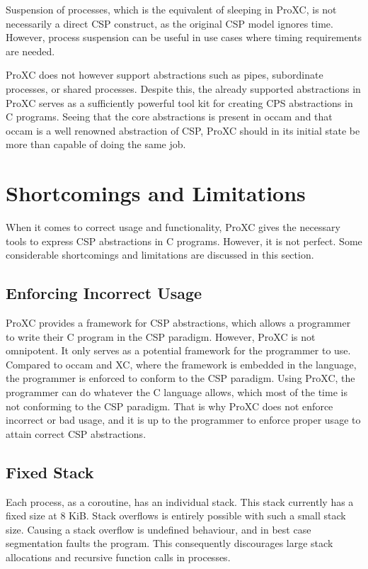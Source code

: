 Suspension of processes, which is the equivalent of sleeping in ProXC, is not necessarily a direct CSP construct, as the original CSP model ignores time. However, process suspension can be useful in use cases where timing requirements are needed.

ProXC does not however support abstractions such as pipes, subordinate processes, or sha\-red processes. Despite this, the already supported abstractions in ProXC serves as a sufficiently powerful tool kit for creating CPS abstractions in C programs. Seeing that the core abstractions is present in occam and that occam is a well renowned abstraction of CSP, ProXC should in its initial state be more than capable of doing the same job. 

\section{Shortcomings and Limitations}

When it comes to correct usage and functionality, ProXC gives the necessary tools to express CSP abstractions in C programs. However, it is not perfect. Some considerable shortcomings and limitations are discussed in this section.

\subsection{Enforcing Incorrect Usage}

ProXC provides a framework for CSP abstractions, which allows a programmer to write their C program in the CSP paradigm. However, ProXC is not omnipotent. It only serves as a potential framework for the programmer to use. Compared to occam and XC, where the framework is embedded in the language, the programmer is enforced to conform to the CSP paradigm. Using ProXC, the programmer can do whatever the C language allows, which most of the time is not conforming to the CSP paradigm. That is why ProXC does not enforce incorrect or bad usage, and it is up to the programmer to enforce proper usage to attain correct CSP abstractions.

\subsection{Fixed Stack}

Each process, as a coroutine, has an individual stack. This stack currently has a fixed size at 8 KiB. Stack overflows is entirely possible with such a small stack size. Causing a stack overflow is undefined behaviour, and in best case segmentation faults the program. This consequently discourages large stack allocations and recursive function calls in processes.

